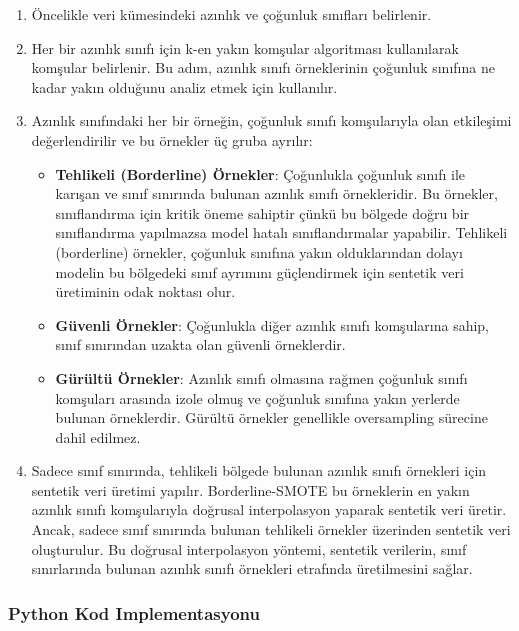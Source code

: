 \begin{enumerate}
    \item Öncelikle veri kümesindeki azınlık ve çoğunluk sınıfları belirlenir.
    \item Her bir azınlık sınıfı için k-en yakın komşular algoritması kullanılarak komşular belirlenir. Bu adım, azınlık sınıfı örneklerinin çoğunluk sınıfına ne kadar yakın olduğunu analiz etmek için kullanılır.
    \item Azınlık sınıfındaki her bir örneğin, çoğunluk sınıfı komşularıyla olan etkileşimi değerlendirilir ve bu örnekler üç gruba ayrılır:
    \begin{itemize}
        \item \textbf{Tehlikeli (Borderline) Örnekler}: Çoğunlukla çoğunluk sınıfı ile karışan ve sınıf sınırında bulunan azınlık sınıfı örnekleridir. Bu örnekler, sınıflandırma için kritik öneme sahiptir çünkü bu bölgede doğru bir sınıflandırma yapılmazsa model hatalı sınıflandırmalar yapabilir. Tehlikeli (borderline) örnekler, çoğunluk sınıfına yakın olduklarından dolayı modelin bu bölgedeki sınıf ayrımını güçlendirmek için sentetik veri üretiminin odak noktası olur.
        \item \textbf{Güvenli Örnekler}: Çoğunlukla diğer azınlık sınıfı komşularına sahip, sınıf sınırından uzakta olan güvenli örneklerdir.
        \item \textbf{Gürültü Örnekler}: Azınlık sınıfı olmasına rağmen çoğunluk sınıfı komşuları arasında izole olmuş ve çoğunluk sınıfına yakın yerlerde bulunan örneklerdir. Gürültü örnekler genellikle oversampling sürecine dahil edilmez.
    \end{itemize}
    \item Sadece sınıf sınırında, tehlikeli bölgede bulunan azınlık sınıfı örnekleri için sentetik veri üretimi yapılır. Borderline-SMOTE bu örneklerin en yakın azınlık sınıfı komşularıyla doğrusal interpolasyon yaparak sentetik veri üretir. Ancak, sadece sınıf sınırında bulunan tehlikeli örnekler üzerinden sentetik veri oluşturulur. Bu doğrusal interpolasyon yöntemi, sentetik verilerin, sınıf sınırlarında bulunan azınlık sınıfı örnekleri etrafında üretilmesini sağlar.
\end{enumerate}

\subsubsection{Python Kod Implementasyonu}

